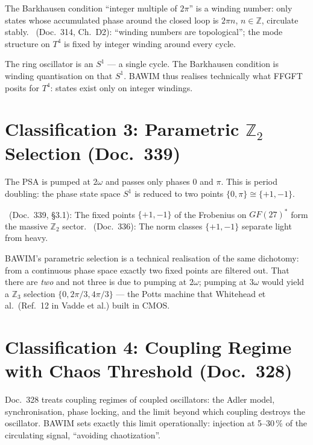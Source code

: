 The Barkhausen condition ``integer multiple of $2\pi$'' is a winding
number: only states whose accumulated phase around the closed loop is
$2\pi n$, $n\in\mathbb{Z}$, circulate stably. \BM\ (Doc.~314, Ch.~D2):
``winding numbers are topological''; the mode structure on $T^4$ is fixed
by integer winding around every cycle.

The ring oscillator is an $S^1$ --- a single cycle. The Barkhausen
condition is winding quantisation on that $S^1$. BAWIM thus realises
technically what FFGFT posits for $T^4$: states exist only on integer
windings. \SM

\section{Classification 3: Parametric $\mathbb{Z}_2$ Selection (Doc.~339)}

The PSA is pumped at $2\omega$ and passes only phases $0$ and $\pi$. This is
period doubling: the phase state space $S^1$ is reduced to two points
$\{0,\pi\}\cong\{+1,-1\}$.

\BM\ (Doc.~339, §3.1): The fixed points $\{+1,-1\}$ of the Frobenius on
$GF(27)^*$ form the massive $\mathbb{Z}_2$ sector. \BM\ (Doc.~336): The
norm classes $\{+1,-1\}$ separate light from heavy.

BAWIM's parametric selection is a technical realisation of the same
dichotomy: from a continuous phase space exactly two fixed points are
filtered out. That there are \emph{two} and not three is due to pumping
at $2\omega$; pumping at $3\omega$ would yield a $\mathbb{Z}_3$ selection
$\{0,2\pi/3,4\pi/3\}$ --- the Potts machine that Whitehead et al.\
(Ref.~12 in Vadde et al.) built in CMOS. \SM

\section{Classification 4: Coupling Regime with Chaos Threshold (Doc.~328)}

Doc.~328 treats coupling regimes of coupled oscillators: the Adler model,
synchronisation, phase locking, and the limit beyond which coupling
destroys the oscillator. BAWIM sets exactly this limit operationally:
injection at 5--30\,\% of the circulating signal, ``avoiding chaotization''.

